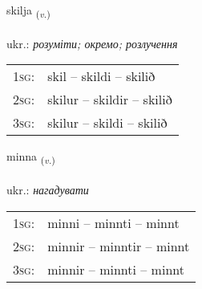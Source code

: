 \documentclass[frontgrid, backgrid]{flacards}\usepackage[]{graphicx}\usepackage[]{xcolor}
\begin{document}
\renewcommand{\flhead}{\vskip5pt \fboxsep=0pt {\small\bfseries\footnotesize Sagnorð | дієслово}}
\renewcommand{\fcfoot}{\vskip5pt \fboxsep=0pt \hspace{2pt}{\small\bfseries\footnotesize 1K}}

\renewcommand{\blhead}{\vskip5pt {\small\bfseries\footnotesize Sagnorð | дієслово }}
\renewcommand{\bcfoot}{\vskip5pt \hspace{2pt}{\small\bfseries\footnotesize 1K}}


{skilja \small{\textsubscript{(\textit{v.})}} \\[1ex] %
\textphonetic{[scɪlja]} \\
ukr.: \emph{розуміти; окремо; розлучення} \\  [2ex]
\renewcommand*{\arraystretch}{0.8}
\begin{tabular}{p{1cm}l}
\textsc{1sg}: & skil -- skildi -- skilið \\ 
\textsc{2sg}: & skilur -- skildir -- skilið \\ 
\textsc{3sg}: & skilur -- skildi -- skilið \\ 
\end{tabular}
}

\renewcommand{\flhead}{\vskip5pt \fboxsep=0pt {\small\bfseries\footnotesize Sagnorð | дієслово}}
\renewcommand{\fcfoot}{\vskip5pt \fboxsep=0pt \hspace{2pt}{\small\bfseries\footnotesize 1K}}

\renewcommand{\blhead}{\vskip5pt {\small\bfseries\footnotesize Sagnorð | дієслово }}
\renewcommand{\bcfoot}{\vskip5pt \hspace{2pt}{\small\bfseries\footnotesize 1K}}


{minna \small{\textsubscript{(\textit{v.})}} \\[1ex] %
\textphonetic{[mɪna]} \\
ukr.: \emph{нагадувати} \\  [2ex]
\renewcommand*{\arraystretch}{0.8}
\begin{tabular}{p{1cm}l}
\textsc{1sg}: & minni -- minnti -- minnt \\ 
\textsc{2sg}: & minnir -- minntir -- minnt \\ 
\textsc{3sg}: & minnir -- minnti -- minnt \\ 
\end{tabular}
}
\end{document}
